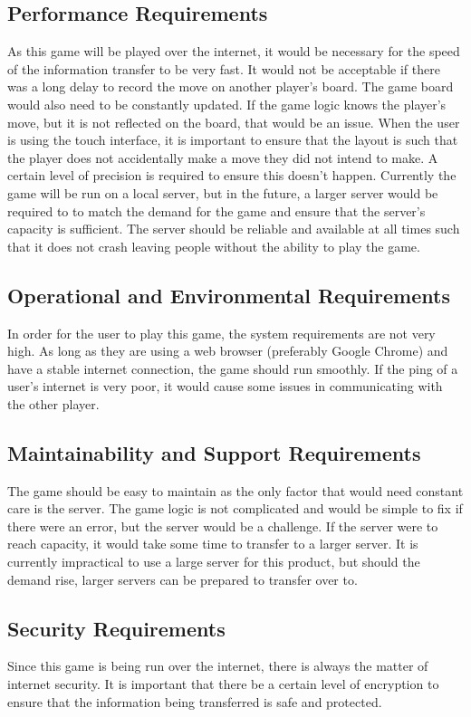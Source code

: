 \documentclass[12pt, titlepage]{article}
\begin{document}
\subsection{Performance Requirements}
As this game will be played over the internet, it would be necessary for the
speed of the information transfer to be very fast. It would not be acceptable if
there was a long delay to record the move on another player's board. The game
board would also need to be constantly updated. If the game logic knows the
player's move, but it is not reflected on the board, that would be an issue.
When the user is using the touch interface, it is important to ensure that the
layout is such that the player does not accidentally make a move they did not
intend to make. A certain level of precision is required to ensure this doesn't
happen. Currently the game will be run on a local server, but in the future, a
larger server would be required to to match the demand for the game and ensure
that the server's capacity is sufficient. The server should be reliable and
available at all times such that it does not crash leaving people without the
ability to play the game.

\subsection{Operational and Environmental Requirements}
In order for the user to play this game, the system requirements are not very
high. As long as they are using a web browser (preferably Google Chrome) and
have a stable internet connection, the game should run smoothly. If the ping of
a user's internet is very poor, it would cause some issues in communicating with
the other player.

\subsection{Maintainability and Support Requirements}
The game should be easy to maintain as the only factor that would need constant
care is the server. The game logic is not complicated and would be simple to fix
if there were an error, but the server would be a challenge. If the server were
to reach capacity, it would take some time to transfer to a larger server. It is
currently impractical to use a large server for this product, but should the
demand rise, larger servers can be prepared to transfer over to.

\subsection{Security Requirements}
Since this game is being run over the internet, there is always the matter of
internet security. It is important that there be a certain level of encryption
to ensure that the information being transferred is safe and protected.
\end{document}
